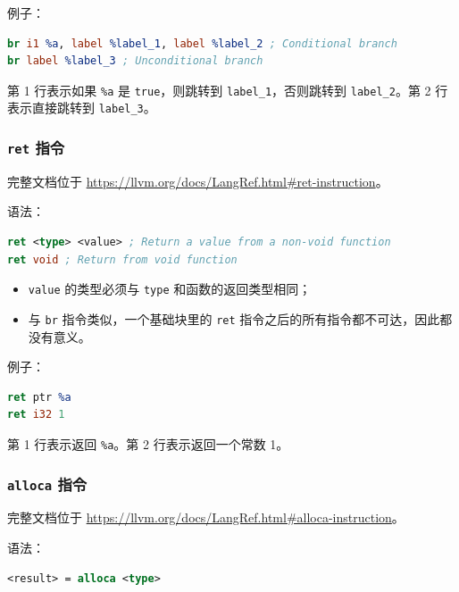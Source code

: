 例子：
\begin{lstlisting}[language=llvm]
br i1 %a, label %label_1, label %label_2 ; Conditional branch
br label %label_3 ; Unconditional branch
\end{lstlisting}

第 1 行表示如果 \texttt{\%a} 是 \texttt{true}，则跳转到
\texttt{label\_1}，否则跳转到 \texttt{label\_2}。第 2 行表示直接跳转到
\texttt{label\_3}。

\subsubsection{\texttt{ret} 指令}\label{LLVM-ret-instructions}

\begin{remark}
完整文档位于 \url{https://llvm.org/docs/LangRef.html\#ret-instruction}。
\end{remark}

语法：
\begin{lstlisting}[language=llvm]
ret <type> <value> ; Return a value from a non-void function
ret void ; Return from void function
\end{lstlisting}

\begin{itemize}
  \item \texttt{value} 的类型必须与 \texttt{type} 和函数的返回类型相同；
  \item 与 \texttt{br} 指令类似，一个基础块里的 \texttt{ret}
    指令之后的所有指令都不可达，因此都没有意义。
\end{itemize}

例子：
\begin{lstlisting}[language=llvm]
ret ptr %a
ret i32 1
\end{lstlisting}

第 1 行表示返回 \texttt{\%a}。第 2 行表示返回一个常数 1。

\subsubsection{\texttt{alloca} 指令}\label{LLVM-alloca-instructions}

\begin{remark}
完整文档位于 \url{https://llvm.org/docs/LangRef.html\#alloca-instruction}。
\end{remark}

语法：
\begin{lstlisting}[language=llvm]
<result> = alloca <type>
\end{lstlisting}

